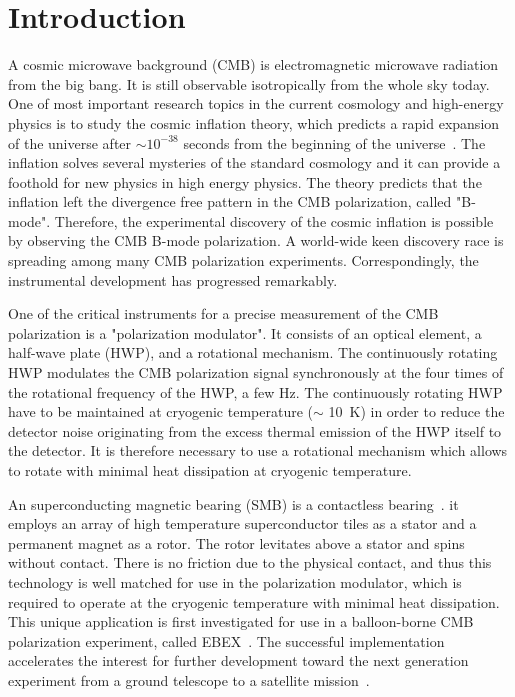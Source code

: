 \documentclass[a4paper]{jpconf}
\begin{document}
\section*{Introduction}

A cosmic microwave background (CMB) is electromagnetic microwave radiation from the big bang.
It is still observable isotropically from the whole sky today.
One of most important research topics in the current cosmology and high-energy physics is to study the cosmic inflation theory, which predicts a rapid expansion of the universe after $\sim 10^{-38}$ seconds from the beginning of the universe~\cite{inflation_sato,inflation_guth}.
The inflation solves several mysteries of the standard cosmology and it can provide a foothold for new physics in high energy physics.
The theory predicts that the inflation left the divergence free pattern in the CMB polarization,  called "B-mode".
Therefore, the experimental discovery of the cosmic inflation is possible by observing the CMB B-mode polarization.
A world-wide keen discovery race is spreading among many CMB polarization experiments.
Correspondingly, the instrumental development has progressed remarkably.

One of the critical instruments for a precise measurement of the CMB polarization is a "polarization modulator".
It consists of an optical element, a half-wave plate (HWP), and a rotational mechanism.
The continuously rotating HWP modulates the CMB polarization signal synchronously at the four times of the rotational frequency of the HWP, a few Hz.
The continuously rotating HWP have to be maintained at cryogenic temperature ($\sim$ 10~K) in order to reduce the detector noise originating from the excess thermal emission of the HWP itself to the detector.
It is therefore necessary to use a rotational mechanism which allows to rotate with minimal heat dissipation at cryogenic temperature.

An superconducting magnetic bearing (SMB) is a contactless bearing~\cite{smb}.
it employs an array of high temperature superconductor tiles as a stator and a permanent magnet as a rotor.
The rotor levitates above a stator and spins without contact.
There is no friction due to the physical contact, and thus this technology is well matched for use in the polarization modulator, which is required to operate at the cryogenic temperature with minimal heat dissipation.
This unique application is first investigated for use in a balloon-borne CMB polarization experiment, called EBEX~\cite{ebex}.
The successful implementation accelerates the interest for further development toward the next generation experiment from a ground telescope to a satellite mission~\cite{litebird}.
\end{document}
